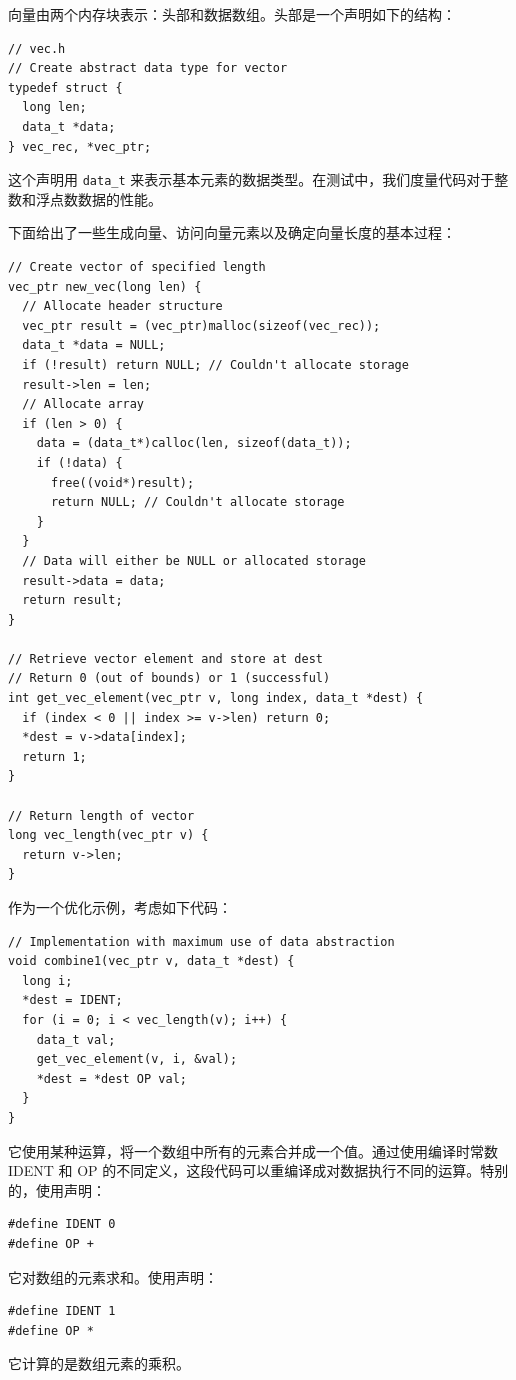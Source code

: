 向量由两个内存块表示：头部和数据数组。头部是一个声明如下的结构：

\begin{verbatim}
// vec.h
// Create abstract data type for vector
typedef struct {
  long len;
  data_t *data;
} vec_rec, *vec_ptr;
\end{verbatim}

这个声明用 \verb|data_t| 来表示基本元素的数据类型。在测试中，我们度量代码对于整数和浮点数数据的性能。

下面给出了一些生成向量、访问向量元素以及确定向量长度的基本过程：

\begin{verbatim}
// Create vector of specified length
vec_ptr new_vec(long len) {
  // Allocate header structure
  vec_ptr result = (vec_ptr)malloc(sizeof(vec_rec));
  data_t *data = NULL;
  if (!result) return NULL; // Couldn't allocate storage
  result->len = len;
  // Allocate array
  if (len > 0) {
    data = (data_t*)calloc(len, sizeof(data_t));
    if (!data) {
      free((void*)result);
      return NULL; // Couldn't allocate storage
    }
  }
  // Data will either be NULL or allocated storage
  result->data = data;
  return result;
}

// Retrieve vector element and store at dest
// Return 0 (out of bounds) or 1 (successful)
int get_vec_element(vec_ptr v, long index, data_t *dest) {
  if (index < 0 || index >= v->len) return 0;
  *dest = v->data[index];
  return 1;
}

// Return length of vector
long vec_length(vec_ptr v) {
  return v->len;
}
\end{verbatim}

作为一个优化示例，考虑如下代码：

\begin{verbatim}
// Implementation with maximum use of data abstraction
void combine1(vec_ptr v, data_t *dest) {
  long i;
  *dest = IDENT;
  for (i = 0; i < vec_length(v); i++) {
    data_t val;
    get_vec_element(v, i, &val);
    *dest = *dest OP val;
  }
}
\end{verbatim}

它使用某种运算，将一个数组中所有的元素合并成一个值。通过使用编译时常数 IDENT 和 OP 的不同定义，这段代码可以重编译成对数据执行不同的运算。特别的，使用声明：
\begin{verbatim}
#define IDENT 0
#define OP +
\end{verbatim}
它对数组的元素求和。使用声明：
\begin{verbatim}
#define IDENT 1
#define OP *
\end{verbatim}
它计算的是数组元素的乘积。

